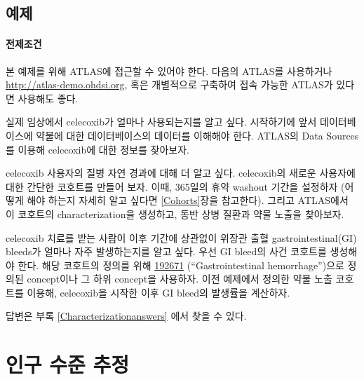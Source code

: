 \documentclass[10.5pt]{book}
\theoremstyle{definition}
\theoremstyle{definition}
\theoremstyle{definition}
\theoremstyle{remark}
\let\BeginKnitrBlock\begin \let\EndKnitrBlock\end
\begin{document}
\section{예제}\label{-6}

\subsubsection*{전제조건}\label{-4}

본 예제를 위해 ATLAS에 접근할 수 있어야 한다. 다음의 ATLAS를 사용하거나
\url{http://atlas-demo.ohdsi.org}, 혹은 개별적으로 구축하여 접속 가능한
ATLAS가 있다면 사용해도 좋다.

\BeginKnitrBlock{exercise}
\protect\hypertarget{exr:exerciseCharacterization1}{}{\label{exr:exerciseCharacterization1}
}실제 임상에서 celecoxib가 얼마나 사용되는지를 알고 싶다. 시작하기에
앞서 데이터베이스에 약물에 대한 데이터베이스의 데이터를 이해해야 한다.
ATLAS의 Data Sources를 이용해 celecoxib에 대한 정보를 찾아보자.
\EndKnitrBlock{exercise}

\BeginKnitrBlock{exercise}
\protect\hypertarget{exr:exerciseCharacterization2}{}{\label{exr:exerciseCharacterization2}
}celecoxib 사용자의 질병 자연 경과에 대해 더 알고 싶다. celecoxib의
새로운 사용자에 대한 간단한 코호트를 만들어 보자. 이때, 365일의 휴약
washout 기간을 설정하자 (어떻게 해야 하는지 자세히 알고 싶다면
\ref{Cohorts}장을 참고한다). 그리고 ATLAS에서 이 코호트의
characterization을 생성하고, 동반 상병 질환과 약물 노출을 찾아보자.
\EndKnitrBlock{exercise}

\BeginKnitrBlock{exercise}
\protect\hypertarget{exr:exerciseCharacterization3}{}{\label{exr:exerciseCharacterization3}
}celecoxib 치료를 받는 사람이 이후 기간에 상관없이 위장관 출혈
gastrointestinal(GI) bleeds가 얼마나 자주 발생하는지를 알고 싶다. 우선
GI bleed의 사건 코호트를 생성해야 한다. 해당 코호트의 정의를 위해
\href{http://athena.ohdsi.org/search-terms/terms/192671}{192671}
(``Gastrointestinal hemorrhage'')으로 정의된 concept이나 그 하위
concept을 사용하자. 이전 예제에서 정의한 약물 노출 코호트를 이용해,
celecoxib을 시작한 이후 GI bleed의 발생률을 계산하자.
\EndKnitrBlock{exercise}

답변은 부록 \ref{Characterizationanswers} 에서 찾을 수 있다.

\chapter{인구 수준 추정}\label{PopulationLevelEstimation}
\end{document}
